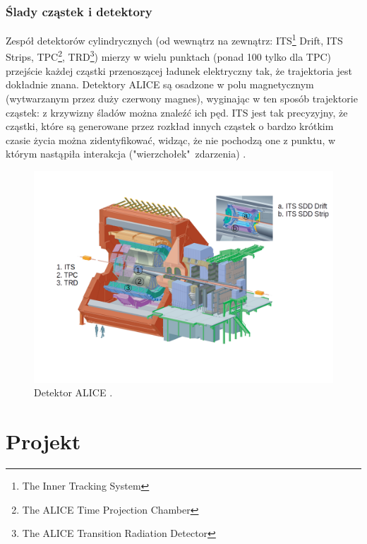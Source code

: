 \subsubsection{Ślady cząstek i detektory}
Zespół detektorów cylindrycznych (od wewnątrz na zewnątrz: ITS\footnote{The Inner Tracking System}  Drift, ITS Strips, TPC\footnote{The ALICE Time Projection Chamber}, TRD\footnote{The ALICE Transition Radiation Detector}) mierzy w wielu punktach (ponad 100 tylko dla TPC) przejście każdej cząstki przenoszącej ładunek elektryczny tak, że trajektoria jest dokładnie znana. Detektory ALICE są osadzone w polu magnetycznym (wytwarzanym przez duży czerwony magnes), wyginając w ten sposób trajektorie cząstek: z krzywizny śladów można znaleźć ich pęd. ITS jest tak precyzyjny, że cząstki, które są generowane przez rozkład innych cząstek o bardzo krótkim czasie życia można zidentyfikować, widząc, że nie pochodzą one z punktu, w którym nastąpiła interakcja ("wierzchołek"\ zdarzenia) \cite{trackingparticles}.

\begin{figure}[H]
		\centering
 		\includegraphics[width=16cm]{detector.png}
    	\caption{Detektor ALICE \cite{aliceofficial}.}
 		\label{rys9}
\end{figure}
\newpage
\section{Projekt}
